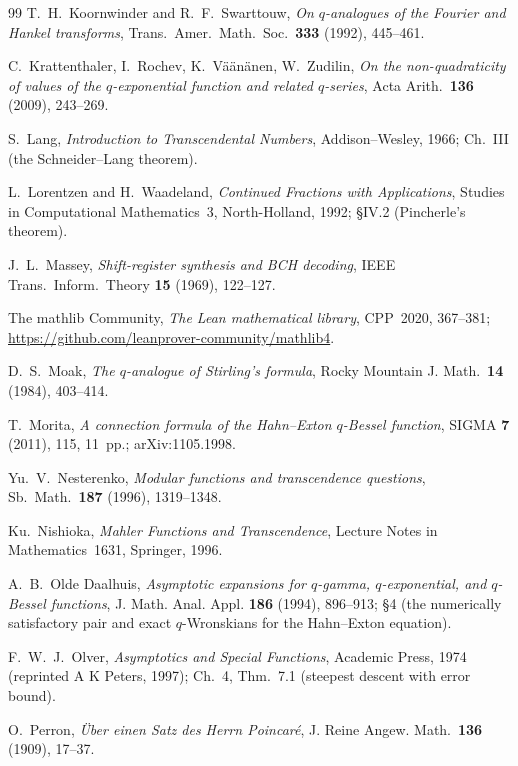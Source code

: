\documentclass[11pt]{article}
\theoremstyle{plain}
\theoremstyle{definition}
\theoremstyle{remark}
\begin{document}
\begin{thebibliography}{99}
 T.~H.~Koornwinder and R.~F.~Swarttouw, \emph{On $q$-analogues of the Fourier and
Hankel transforms}, Trans.\ Amer.\ Math.\ Soc.\ \textbf{333} (1992), 445--461.

 C.~Krattenthaler, I.~Rochev, K.~V\"a\"an\"anen, W.~Zudilin, \emph{On the
non-quadraticity of values of the $q$-exponential function and related $q$-series}, Acta Arith.\
\textbf{136} (2009), 243--269.

 S.~Lang, \emph{Introduction to Transcendental Numbers}, Addison--Wesley, 1966;
Ch.~III (the Schneider--Lang theorem).

 L.~Lorentzen and H.~Waadeland, \emph{Continued Fractions with
Applications}, Studies in Computational Mathematics~3, North-Holland, 1992; \S IV.2 (Pincherle's
theorem).

 J.~L.~Massey, \emph{Shift-register synthesis and BCH decoding}, IEEE Trans.\
Inform.\ Theory \textbf{15} (1969), 122--127.

 The mathlib Community, \emph{The Lean mathematical library},
CPP~2020, 367--381; \url{https://github.com/leanprover-community/mathlib4}.

\bibitem{Moak1984} D.~S.~Moak, \emph{The $q$-analogue of Stirling's formula}, Rocky Mountain J.
Math.\ \textbf{14} (1984), 403--414.

 T.~Morita, \emph{A connection formula of the Hahn--Exton $q$-Bessel function},
SIGMA \textbf{7} (2011), 115, 11~pp.; arXiv:1105.1998.

 Yu.~V.~Nesterenko, \emph{Modular functions and transcendence questions},
Sb.\ Math.\ \textbf{187} (1996), 1319--1348.

 Ku.~Nishioka, \emph{Mahler Functions and Transcendence}, Lecture Notes in
Mathematics~1631, Springer, 1996.

 A.~B.~Olde Daalhuis, \emph{Asymptotic expansions for $q$-gamma, $q$-exponential,
and $q$-Bessel functions}, J. Math. Anal. Appl. \textbf{186} (1994), 896--913; \S4 (the numerically
satisfactory pair and exact $q$-Wronskians for the Hahn--Exton equation).

\bibitem{Olver} F.~W.~J.~Olver, \emph{Asymptotics and Special Functions}, Academic Press, 1974 (reprinted A K Peters, 1997); Ch.~4, Thm.~7.1 (steepest descent with error bound).

\bibitem{Perron1909} O.~Perron, \emph{\"Uber einen Satz des Herrn Poincar\'e}, J. Reine Angew.
Math.\ \textbf{136} (1909), 17--37.


\end{thebibliography}
\end{document}
